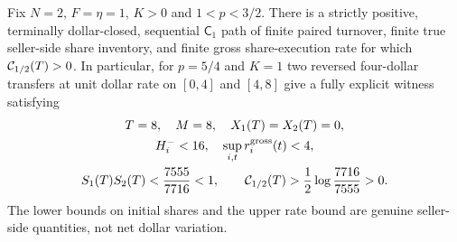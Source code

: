 \documentclass[review,hidelinks,onefignum,onetabnum]{siamonline250211}%
\begin{document}
\begin{theorem}
\label{thm:two-large-turnover}
Fix $N=2$, $F=\eta=1$, $K>0$ and $1<p<3/2$. There is
a strictly positive, terminally dollar-closed, sequential
$\mathsf C_1$ path of finite paired turnover, finite true
seller-side share inventory, and finite gross share-execution
rate for which $\mathcal{C}_{1/2}(T)>0$.
In particular, for $p=5/4$ and $K=1$ two reversed
four-dollar transfers at unit dollar rate on $[0,4]$
and $[4,8]$ give a fully explicit witness satisfying
\begin{equation}\label{eq:two-explicit-witness}
\begin{gathered}
 T=8,\quad M=8,\quad X_1(T)=X_2(T)=0,\\
 H_i^-<16,\quad \sup_{i,t}r_i^{\rm gross}(t)<4,\\
 S_1(T)S_2(T)<\frac{7555}{7716}<1,\qquad
 \mathcal{C}_{1/2}(T)>\frac12\log\frac{7716}{7555}>0.
\end{gathered}
\end{equation}
The lower bounds on initial shares and the upper rate bound
are genuine seller-side quantities, not net dollar variation.
\end{theorem}
\end{document}
